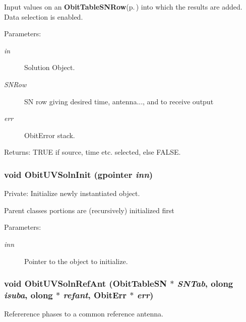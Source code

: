 Input values on an {\bf Obit\-Table\-SNRow}{\rm (p.\,\pageref{structObitTableSNRow})} into which the results are added. Data selection is enabled. \begin{Desc}
\item[Parameters:]
\begin{description}
\item[{\em in}]Solution Object. \item[{\em SNRow}]SN row giving desired time, antenna..., and to receive output \item[{\em err}]Obit\-Error stack. \end{description}
\end{Desc}
\begin{Desc}
\item[Returns:]TRUE if source, time etc. selected, else FALSE. \end{Desc}
\subsubsection{\setlength{\rightskip}{0pt plus 5cm}void Obit\-UVSoln\-Init (gpointer {\em inn})}\label{ObitUVSoln_8c_a3}


Private: Initialize newly instantiated object. 

Parent classes portions are (recursively) initialized first \begin{Desc}
\item[Parameters:]
\begin{description}
\item[{\em inn}]Pointer to the object to initialize. \end{description}
\end{Desc}
\subsubsection{\setlength{\rightskip}{0pt plus 5cm}void Obit\-UVSoln\-Ref\-Ant ({\bf Obit\-Table\-SN} $\ast$ {\em SNTab}, {\bf olong} {\em isuba}, {\bf olong} $\ast$ {\em refant}, {\bf Obit\-Err} $\ast$ {\em err})}\label{ObitUVSoln_8c_a26}


Refererence phases to a common reference antenna. 

